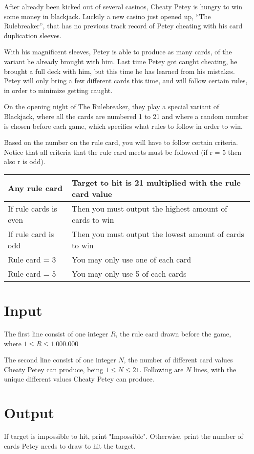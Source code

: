 
After already been kicked out of several casinos, Cheaty Petey is hungry to win some money in blackjack. Luckily a new casino just opened up, “The Rulebreaker”, that has no previous track record of Petey cheating with his card duplication sleeves.

With his magnificent sleeves, Petey is able to produce as many cards, of the variant he already brought with him. Last time Petey got caught cheating, he brought a full deck with him, but this time he has learned from his mistakes. Petey will only bring a few different cards this time, and will follow certain rules, in order to minimize getting caught.

On the opening night of The Rulebreaker, they play a special variant of Blackjack, where all the cards are numbered 1 to 21 and where a random number is chosen before each game, which specifies what rules to follow in order to win. 

Based on the number on the rule card, you will have to follow certain criteria. Notice that all criteria that the rule card meets must be followed (if r = 5 then also r is odd). 


\begin{tabular}{|ll|}
\hline
\textbf{Any rule card} & \textbf{Target to hit is 21 multiplied with the rule card value} \\ \hline
If rule cards is even & Then you must output the highest amount of cards to win \\ \hline
If rule card is odd   & Then you must output the lowest amount of cards to win  \\ \hline
Rule card = 3         & You may only use one of each card                       \\ \hline
Rule card = 5         & You may only use 5 of each cards                        \\ \hline
\end{tabular}

\section*{Input}
The first line consist of one integer $R$, the rule card drawn before the game, where 
$1\leq R \leq 1.000.000$



The second line consist of one integer $N$, the number of different card values Cheaty Petey can produce, being $1\leq N \leq 21$. Following are $N$ lines, with the unique different values Cheaty Petey can produce.

\section*{Output}
If target is impossible to hit, print "Impossible". Otherwise, print the number of cards Petey needs to draw to hit the target.
